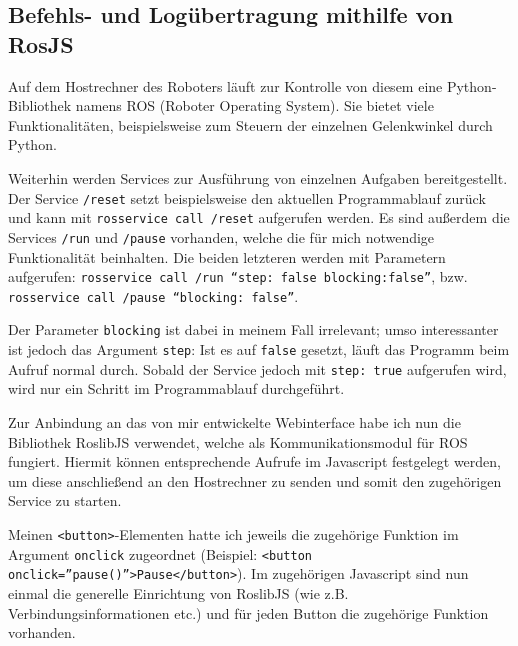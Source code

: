 \documentclass[xcolor=dvipsnames,11pt,paper=a4paper]{report}
\begin{document}
\subsection{Befehls- und Logübertragung mithilfe von RosJS}

Auf dem Hostrechner des Roboters läuft zur Kontrolle von diesem eine Python-Bibliothek
namens ROS (Roboter Operating System). Sie bietet viele Funktionalitäten, beispielsweise
zum Steuern der einzelnen Gelenkwinkel durch Python.

Weiterhin werden Services zur Ausführung von einzelnen Aufgaben bereitgestellt.
Der Service \texttt{/reset} setzt beispielsweise den aktuellen Programmablauf
zurück und kann mit \texttt{rosservice call /reset} aufgerufen werden. Es sind
außerdem die Services \texttt{/run} und \texttt{/pause} vorhanden, welche die für
mich notwendige Funktionalität beinhalten. Die beiden letzteren werden mit Parametern
aufgerufen: \texttt{rosservice call /run ``step: false blocking:false''}, bzw.
\texttt{rosservice call /pause ``blocking: false''}.

Der Parameter \texttt{blocking} ist dabei in meinem Fall irrelevant; umso interessanter
ist jedoch das Argument \texttt{step}: Ist es auf \texttt{false} gesetzt, läuft
das Programm beim Aufruf normal durch. Sobald der Service jedoch mit \texttt{step: true}
aufgerufen wird, wird nur ein Schritt im Programmablauf durchgeführt.

Zur Anbindung an das von mir entwickelte Webinterface habe ich nun die Bibliothek
RoslibJS verwendet, welche als Kommunikationsmodul für ROS fungiert. Hiermit können
entsprechende Aufrufe im Javascript festgelegt werden, um diese anschließend an
den Hostrechner zu senden und somit den zugehörigen Service zu starten.

Meinen \texttt{<button>}-Elementen hatte ich jeweils die zugehörige Funktion im
Argument \texttt{onclick} zugeordnet (Beispiel: \texttt{<button onclick=''pause()''>Pause</button>}).
Im zugehörigen Javascript sind nun einmal die generelle Einrichtung von RoslibJS
(wie z.B. Verbindungsinformationen etc.) und für jeden Button die zugehörige Funktion
vorhanden.

\end{document}
